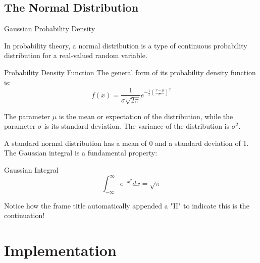 \documentclass[aspectratio=169]{beamer}
\begin{document}
\subsection{The Normal Distribution}

\begin{frame}[allowframebreaks]{Gaussian Probability Density}
    
    In probability theory, a normal distribution is a type of continuous probability distribution for a real-valued random variable.
    
    \vspace{0.5cm}
    \begin{block}{Probability Density Function}
        The general form of its probability density function is:
        $$ f(x) = \frac{1}{\sigma \sqrt{2\pi}} e^{-\frac{1}{2}\left(\frac{x-\mu}{\sigma}\right)^2} $$
    \end{block}
    
    \vspace{0.5cm}
    The parameter $\mu$ is the mean or expectation of the distribution, while the parameter $\sigma$ is its standard deviation. The variance of the distribution is $\sigma^2$.
    
    \framebreak 
    
    A standard normal distribution has a mean of 0 and a standard deviation of 1. The Gaussian integral is a fundamental property:
    
    \vspace{0.5cm}
    \begin{block}{Gaussian Integral}
        $$ \int_{-\infty}^{\infty} e^{-x^2} dx = \sqrt{\pi} $$
    \end{block}
    
    \vspace{0.5cm}
    Notice how the frame title automatically appended a "II" to indicate this is the continuation!

\end{frame}

\section{Implementation}
\end{document}
